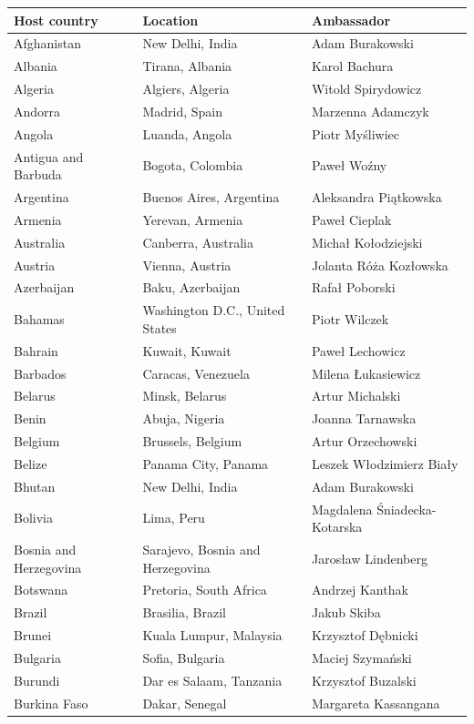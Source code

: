 \documentclass{article}
\begin{document}
\begin{tabular}{lll}
\toprule
Host country & Location & Ambassador \\
\midrule
Afghanistan & New Delhi, India & Adam Burakowski \\
Albania & Tirana, Albania & Karol Bachura \\
Algeria & Algiers, Algeria & Witold Spirydowicz \\
Andorra & Madrid, Spain & Marzenna Adamczyk \\
Angola & Luanda, Angola & Piotr Myśliwiec \\
Antigua and Barbuda & Bogota, Colombia & Paweł Woźny \\
Argentina & Buenos Aires, Argentina & Aleksandra Piątkowska \\
Armenia & Yerevan, Armenia & Paweł Cieplak \\
Australia & Canberra, Australia & Michał Kołodziejski \\
Austria & Vienna, Austria & Jolanta Róża Kozłowska \\
Azerbaijan & Baku, Azerbaijan & Rafał Poborski \\
Bahamas & Washington D.C., United States & Piotr Wilczek \\
Bahrain & Kuwait, Kuwait & Paweł Lechowicz \\
Barbados & Caracas, Venezuela & Milena Łukasiewicz \\
Belarus & Minsk, Belarus & Artur Michalski \\
Benin & Abuja, Nigeria & Joanna Tarnawska \\
Belgium & Brussels, Belgium & Artur Orzechowski \\
Belize & Panama City, Panama & Leszek Włodzimierz Biały \\
Bhutan & New Delhi, India & Adam Burakowski \\
Bolivia & Lima, Peru & Magdalena Śniadecka-Kotarska \\
Bosnia and Herzegovina & Sarajevo, Bosnia and Herzegovina & Jarosław Lindenberg \\
Botswana & Pretoria, South Africa & Andrzej Kanthak \\
Brazil & Brasilia, Brazil & Jakub Skiba \\
Brunei & Kuala Lumpur, Malaysia & Krzysztof Dębnicki \\
Bulgaria & Sofia, Bulgaria & Maciej Szymański \\
Burundi & Dar es Salaam, Tanzania & Krzysztof Buzalski \\
Burkina Faso & Dakar, Senegal & Margareta Kassangana \\

\end{tabular}
\end{document}
